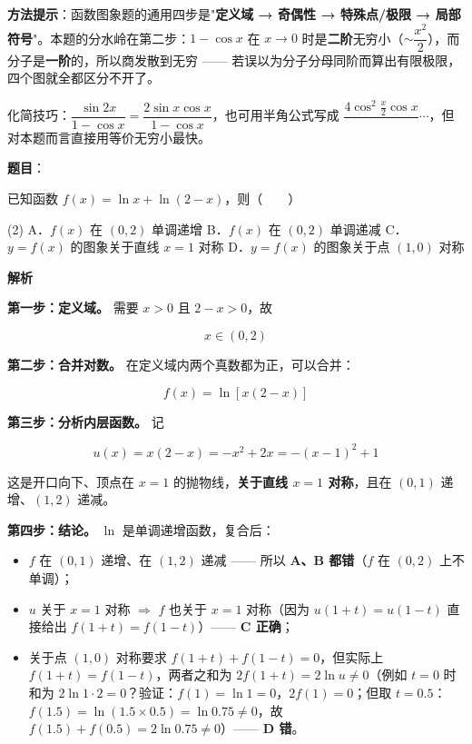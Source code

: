\begin{answer}
\begin{gktip}
\textbf{方法提示}：函数图象题的通用四步是"\textbf{定义域 → 奇偶性 → 特殊点/极限 → 局部符号}"。本题的分水岭在第二步：$1-\cos x$ 在 $x\to0$ 时是\textbf{二阶}无穷小（$\sim\dfrac{x^{2}}2$），而分子是\textbf{一阶}的，所以商发散到无穷 —— 若误以为分子分母同阶而算出有限极限，四个图就全都区分不开了。

化简技巧：$\dfrac{\sin2x}{1-\cos x}=\dfrac{2\sin x\cos x}{1-\cos x}$，也可用半角公式写成 $\dfrac{4\cos^{2}\frac x2\cos x}{\ }\cdots$，但对本题而言直接用等价无穷小最快。
\end{gktip}


\par\medskip

\end{answer}
\begin{answer}

\textbf{题目}：

已知函数 $f(x)=\ln x+\ln(2-x)$，则\mbox{（　　）}

\begin{gkopts}(2)
\task A．$f(x)$ 在 $(0,2)$ 单调递增
\task B．$f(x)$ 在 $(0,2)$ 单调递减
\task C．$y=f(x)$ 的图象关于直线 $x=1$ 对称
\task D．$y=f(x)$ 的图象关于点 $(1,0)$ 对称
\end{gkopts}

\textbf{解析}

\textbf{第一步：定义域。} 需要 $x>0$ 且 $2-x>0$，故

\nopagebreak[4]
\[x\in(0,2)\]

\textbf{第二步：合并对数。} 在定义域内两个真数都为正，可以合并：

\nopagebreak[4]
\[f(x)=\ln\left[x(2-x)\right]\]

\textbf{第三步：分析内层函数。} 记

\nopagebreak[4]
\[u(x)=x(2-x)=-x^{2}+2x=-(x-1)^{2}+1\]

这是开口向下、顶点在 $x=1$ 的抛物线，\textbf{关于直线 $x=1$ 对称}，且在 $(0,1)$ 递增、$(1,2)$ 递减。

\textbf{第四步：结论。} $\ln$ 是单调递增函数，复合后：

\begin{itemize}
\item $f$ 在 $(0,1)$ 递增、在 $(1,2)$ 递减 —— 所以 \textbf{A、B 都错}（$f$ 在 $(0,2)$ 上不单调）；
\item $u$ 关于 $x=1$ 对称 $\Rightarrow$ $f$ 也关于 $x=1$ 对称（因为 $u(1+t)=u(1-t)$ 直接给出 $f(1+t)=f(1-t)$）—— \textbf{C 正确}；
\item 关于点 $(1,0)$ 对称要求 $f(1+t)+f(1-t)=0$，但实际上 $f(1+t)=f(1-t)$，两者之和为 $2f(1+t)=2\ln u\ne0$（例如 $t=0$ 时和为 $2\ln1\cdot2=0$？验证：$f(1)=\ln1=0$，$2f(1)=0$；但取 $t=0.5$：$f(1.5)=\ln(1.5\times0.5)=\ln0.75\ne0$，故 $f(1.5)+f(0.5)=2\ln0.75\ne0$）—— \textbf{D 错}。
\end{itemize}


\end{answer}
